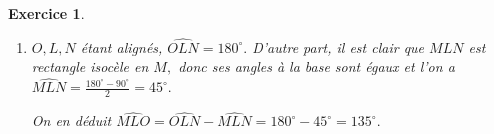 \documentclass[10pt]{article}
\newtheorem{exo}{Exercice}
\begin{document}
\begin{exo}
\begin{enumerate}
\medskip

$KLMN$ est un carré, donc $NK=NM~;$ et donc $N\in\Delta$ d'après la caractérisation ci-dessus. De même, $LK=LM,$ donc $L\in\Delta.$ Enfin $KOM$ est équilatéral, donc $OK=OM$ et par conséquent $O\in\Delta.$

Conclusion~: les points $O,L,N$ sont sur $\Delta,$ donc ils sont alignés.
\item $O,L,N$ étant alignés, $\widehat{OLN}=180^{\circ}.$ D'autre part, il est clair que $MLN$ est rectangle isocèle en $M,$ donc ses angles à la base sont égaux et l'on a $\widehat{MLN}=\frac{180^{\circ}-90^{\circ}}{2}=45^{\circ}.$

On en déduit $\widehat{MLO}=\widehat{OLN}-\widehat{MLN}=180^{\circ}-45^{\circ}=135^{\circ}.$
\end{enumerate}

\end{exo}
\end{document}
